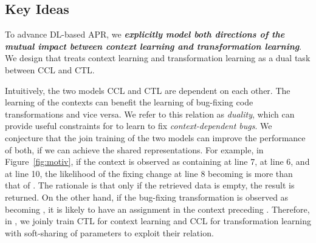 \subsection{Key Ideas}
\label{sec:key-idea}




To advance DL-based APR, we {\bf {\em explicitly model both directions
    of the mutual impact between context learning and transformation
    learning}}. We design {\tool} that treats context learning and
transformation learning as a dual task between CCL and CTL.





Intuitively, the two models CCL and CTL are dependent on each
other. The learning of the contexts can benefit the learning of
bug-fixing code transformations and vice versa. We refer to this
relation as {\em duality}, which can provide useful constraints for
{\tool} to learn to fix {\em context-dependent bugs}. We conjecture
that the join training of the two models can improve the performance
of both, if we can achieve the shared representations. For example, in
Figure~\ref{fig:motiv}, if the context is observed as containing
 at line 7,  at line 6, and
 at line 10, the likelihood of the fixing change
at line 8 becoming  is more than that of
. The rationale is that only if the retrieved
data is empty, the result is returned. On the other hand, if the
bug-fixing transformation is observed as 
becoming , it is likely to have an assignment
 in the context preceding .  Therefore, in {\tool}, we joinly train CTL for context
learning and CCL for transformation learning with soft-sharing of
parameters to exploit their relation.

